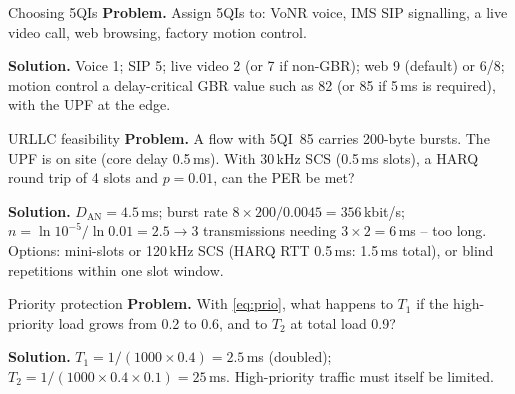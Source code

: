 \documentclass[11pt,a4paper]{article}
\begin{document}
\begin{examplebox}{Choosing 5QIs}\label{ex:5qi}
\textbf{Problem.} Assign 5QIs to: VoNR voice, IMS SIP signalling, a live video call, web browsing, factory motion control.

\textbf{Solution.} Voice 1; SIP 5; live video 2 (or 7 if non-GBR); web 9 (default) or 6/8; motion control a delay-critical GBR value such as 82 (or 85 if
5\,ms is required), with the UPF at the edge.
\end{examplebox}

\begin{examplebox}{URLLC feasibility}\label{ex:urllc}
\textbf{Problem.} A flow with 5QI~85 carries 200-byte bursts. The UPF is on site (core delay 0.5\,ms). With 30\,kHz SCS (0.5\,ms slots), a HARQ round trip
of 4 slots and $p = 0.01$, can the PER be met?

\textbf{Solution.} $D_{\mathrm{AN}} = 4.5$\,ms; burst rate $8\times200/0.0045 = 356$\,kbit/s; $n = \ln10^{-5}/\ln0.01 = 2.5 \to 3$ transmissions needing $3\times2 = 6$\,ms -- too long.
Options: mini-slots or 120\,kHz SCS (HARQ RTT 0.5\,ms: 1.5\,ms total), or blind repetitions within one slot window.
\end{examplebox}

\begin{examplebox}{Priority protection}\label{ex:prio}
\textbf{Problem.} With \cref{eq:prio}, what happens to $T_1$ if the high-priority load grows from 0.2 to 0.6, and to $T_2$ at total load 0.9?

\textbf{Solution.} $T_1 = 1/(1000\times0.4) = 2.5$\,ms (doubled); $T_2 = 1/(1000\times0.4\times0.1) = 25$\,ms. High-priority traffic must itself be limited.
\end{examplebox}

\end{document}
